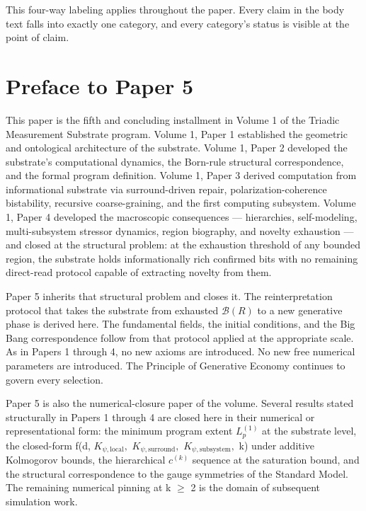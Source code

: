 \documentclass[11pt,oneside]{report}
\theoremstyle{definition}
\theoremstyle{remark}
\begin{document}
This four-way labeling applies throughout the paper. Every claim in the
body text falls into exactly one category, and every category's status
is visible at the point of claim.

\section*{Preface to Paper 5}

This paper is the fifth and concluding installment in Volume 1 of the
Triadic Measurement Substrate program. Volume 1, Paper 1 established the
geometric and ontological architecture of the substrate. Volume 1, Paper
2 developed the substrate's computational dynamics, the Born-rule
structural correspondence, and the formal program definition. Volume 1,
Paper 3 derived computation from informational substrate via
surround-driven repair, polarization-coherence bistability, recursive
coarse-graining, and the first computing subsystem. Volume 1, Paper 4
developed the macroscopic consequences --- hierarchies, self-modeling,
multi-subsystem stressor dynamics, region biography, and novelty
exhaustion --- and closed at the structural problem: at the exhaustion
threshold of any bounded region, the substrate holds informationally
rich confirmed bits with no remaining direct-read protocol capable of
extracting novelty from them.

Paper 5 inherits that structural problem and closes it. The
reinterpretation protocol that takes the substrate from exhausted \ensuremath{\mathcal{B}(R)}
to a new generative phase is derived here. The fundamental fields, the
initial conditions, and the Big Bang correspondence follow from that
protocol applied at the appropriate scale. As in Papers 1 through 4, no
new axioms are introduced. No new free numerical parameters are
introduced. The Principle of Generative Economy continues to govern
every selection.

Paper 5 is also the numerical-closure paper of the volume. Several
results stated structurally in Papers 1 through 4 are closed here in
their numerical or representational form: the minimum program extent
\ensuremath{L_{p}^{(1)}} at the substrate level, the closed-form f(d, \ensuremath{K_{\psi,\mathrm{local}},}
\ensuremath{K_{\psi,\mathrm{surround}},} \ensuremath{K_{\psi,\mathrm{subsystem}},} k) under additive Kolmogorov bounds,
the hierarchical \ensuremath{c^{(k)}} sequence at the saturation bound, and the
structural correspondence to the gauge symmetries of the Standard Model.
The remaining numerical pinning at k \ensuremath{\geq} 2 is the domain of subsequent
simulation work.
\end{document}
